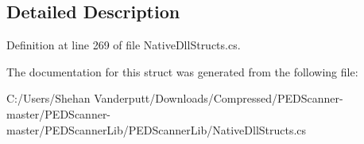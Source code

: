 \subsection{Detailed Description}


Definition at line 269 of file Native\+Dll\+Structs.\+cs.



The documentation for this struct was generated from the following file\+:\begin{DoxyCompactItemize}
\item 
C\+:/\+Users/\+Shehan Vanderputt/\+Downloads/\+Compressed/\+P\+E\+D\+Scanner-\/master/\+P\+E\+D\+Scanner-\/master/\+P\+E\+D\+Scanner\+Lib/\+P\+E\+D\+Scanner\+Lib/Native\+Dll\+Structs.\+cs\end{DoxyCompactItemize}

